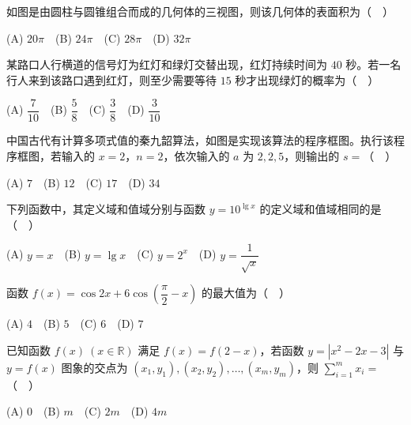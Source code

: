 \begin{question}
如图是由圆柱与圆锥组合而成的几何体的三视图，则该几何体的表面积为（　）
\nopagebreak[4]
\begin{center}\end{center}
\nopagebreak[4]
   (A) $20\pi$　(B) $24\pi$　(C) $28\pi$　(D) $32\pi$

\end{question}
\begin{question}
某路口人行横道的信号灯为红灯和绿灯交替出现，红灯持续时间为 $40$ 秒。若一名行人来到该路口遇到红灯，则至少需要等待 $15$ 秒才出现绿灯的概率为（　）

   (A) $\dfrac7{10}$　(B) $\dfrac58$　(C) $\dfrac38$　(D) $\dfrac3{10}$

\Needspace{0.4\textheight}
\end{question}
\begin{question}
中国古代有计算多项式值的秦九韶算法，如图是实现该算法的程序框图。执行该程序框图，若输入的 $x=2$，$n=2$，依次输入的 $a$ 为 $2,2,5$，则输出的 $s=$（　）
\nopagebreak[4]
\begin{center}\end{center}
\nopagebreak[4]
   (A) $7$　(B) $12$　(C) $17$　(D) $34$

\end{question}
\begin{question}
下列函数中，其定义域和值域分别与函数 $y=10^{\lg x}$ 的定义域和值域相同的是（　）

   (A) $y=x$　(B) $y=\lg x$　(C) $y=2^x$　(D) $y=\dfrac1{\sqrt{x}}$

\end{question}
\begin{question}
函数 $f(x)=\cos 2x+6\cos\left(\dfrac\pi2-x\right)$ 的最大值为（　）

   (A) $4$　(B) $5$　(C) $6$　(D) $7$

\end{question}
\begin{question}
已知函数 $f(x)\ (x\in\mathbb R)$ 满足 $f(x)=f(2-x)$，若函数 $y=|x^2-2x-3|$ 与 $y=f(x)$ 图象的交点为 $(x_1,y_1),(x_2,y_2),\ldots,(x_m,y_m)$，则 $\displaystyle\sum_{i=1}^{m}x_i=$（　）

   (A) $0$　(B) $m$　(C) $2m$　(D) $4m$

\end{question}

